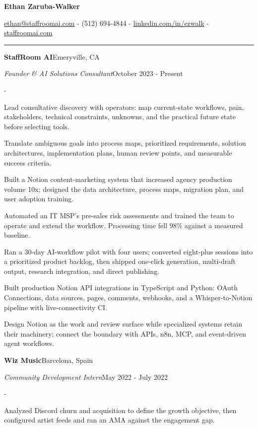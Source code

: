 \documentclass[10pt,letterpaper]{article}
\newenvironment{cvitems}{%
  \begin{list}{-}{%
    \setlength{\leftmargin}{12pt}%
    \setlength{\itemsep}{1.2pt}%
    \setlength{\parsep}{0pt}%
    \setlength{\topsep}{1.5pt}%
    \setlength{\partopsep}{0pt}%
    \setlength{\labelwidth}{6pt}%
    \setlength{\labelsep}{6pt}%
    \setlength{\itemindent}{0pt}%
  }%
}{\end{list}}
\newcommand{\cvsection}[1]{%
  \vspace{7pt}%
  \noindent{\bfseries\fontsize{11pt}{13pt}\selectfont\MakeUppercase{#1}}\par
  \vspace{1pt}%
  \noindent\rule{\textwidth}{0.4pt}\par
  \vspace{4pt}%
}
\newcommand{\cventryhead}[4]{%
  \noindent\textbf{#1}\hfill#2\par
  \vspace{0.5pt}%
  \noindent\textit{#3}\hfill#4\par
}
\begin{document}
\begin{center}
  {\bfseries\fontsize{22pt}{24pt}\selectfont Ethan Zaruba-Walker\par}
  \vspace{4pt}
  {\fontsize{10pt}{12pt}\selectfont
    \href{mailto:ethan@staffroomai.com}{ethan@staffroomai.com}
    {-}
    (512) 694-4844
    {-}
    \href{https://linkedin.com/in/ezwalk}{linkedin.com/in/ezwalk}
    {-}
    \href{https://staffroomai.com}{staffroomai.com}\par}
\end{center}
\vspace{2pt}

\cvsection{Experience}

\cventryhead{StaffRoom AI}{Emeryville, CA}
{Founder \& AI Solutions Consultant}{October 2023 - Present}
\begin{cvitems}
  \item Lead consultative discovery with operators: map current-state workflows, pain, stakeholders, technical constraints, unknowns, and the practical future state before selecting tools.
  \item Translate ambiguous goals into process maps, prioritized requirements, solution architectures, implementation plans, human review points, and measurable success criteria.
  \item Built a Notion content-marketing system that increased agency production volume 10x; designed the data architecture, process maps, migration plan, and user adoption training.
  \item Automated an IT MSP's pre-sales risk assessments and trained the team to operate and extend the workflow. Processing time fell 98\% against a measured baseline.
  \item Ran a 30-day AI-workflow pilot with four users; converted eight-plus sessions into a prioritized product backlog, then shipped one-click generation, multi-draft output, research integration, and direct publishing.
  \item Built production Notion API integrations in TypeScript and Python: OAuth Connections, data sources, pages, comments, webhooks, and a Whisper-to-Notion pipeline with live-connectivity CI.
  \item Design Notion as the work and review surface while specialized systems retain their machinery; connect the boundary with APIs, n8n, MCP, and event-driven agent workflows.
\end{cvitems}

\vspace{3pt}
\cventryhead{Wiz Music}{Barcelona, Spain}
{Community Development Intern}{May 2022 - July 2022}
\begin{cvitems}
  \item Analyzed Discord churn and acquisition to define the growth objective, then configured artist feeds and ran an AMA against the engagement gap.
\end{cvitems}
\end{document}
